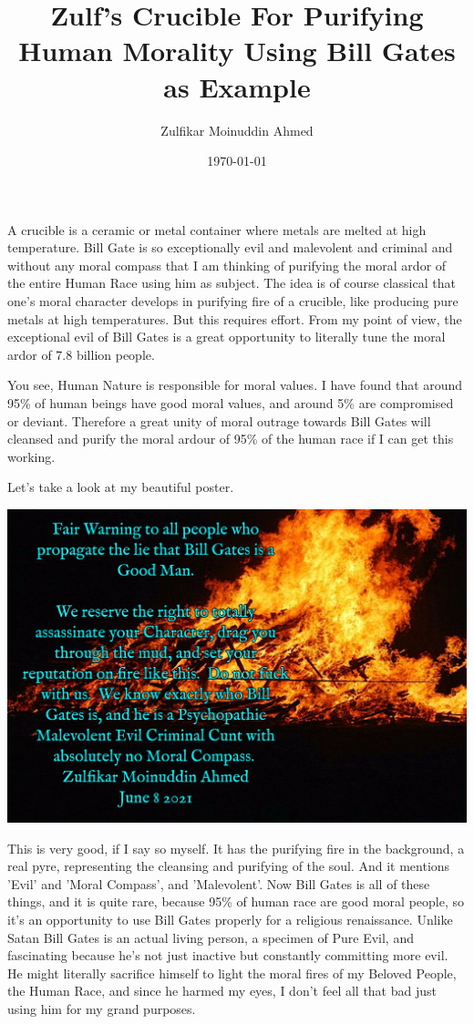 \documentclass{amsart}
\title{Zulf's Crucible For Purifying Human Morality Using Bill Gates as Example}
\author{Zulfikar Moinuddin Ahmed}
\date{\today}
\begin{document}
\maketitle

A crucible is a ceramic or metal container where metals are melted at high temperature.  Bill Gate is so exceptionally evil and malevolent and criminal and without any moral compass that I am thinking of purifying the moral ardor of the entire Human Race using him as subject.  The idea is of course classical that one's moral character develops in purifying fire of a crucible, like producing pure metals at high temperatures.  But this requires effort.  From my point of view, the exceptional evil of Bill Gates is a great opportunity to literally tune the moral ardor of 7.8 billion people.  

You see, Human Nature is responsible for moral values.  I have found that around 95\% of human beings have good moral values, and around 5\% are compromised or deviant.  Therefore a great unity of moral outrage towards Bill Gates will cleansed and purify the moral ardour of 95\% of the human race if I can get this working.

Let's take a look at my beautiful poster.

\includegraphics[scale=0.1]{pyre.jpg}

This is very good, if I say so myself.  It has the purifying fire in the background, a real pyre, representing the cleansing and purifying of the soul.  And it mentions 'Evil' and 'Moral Compass', and 'Malevolent'.  Now Bill Gates is all of these things, and it is quite rare, because 95\% of human race are good moral people, so it's an opportunity to use Bill Gates properly for a religious renaissance.  Unlike Satan Bill Gates is an actual living person, a specimen of Pure Evil, and fascinating because he's not just inactive but constantly committing more evil.  He might literally sacrifice himself to light the moral fires of my Beloved People, the Human Race, and since he harmed my eyes, I don't feel all that bad just using him for my grand purposes.
\end{document}
